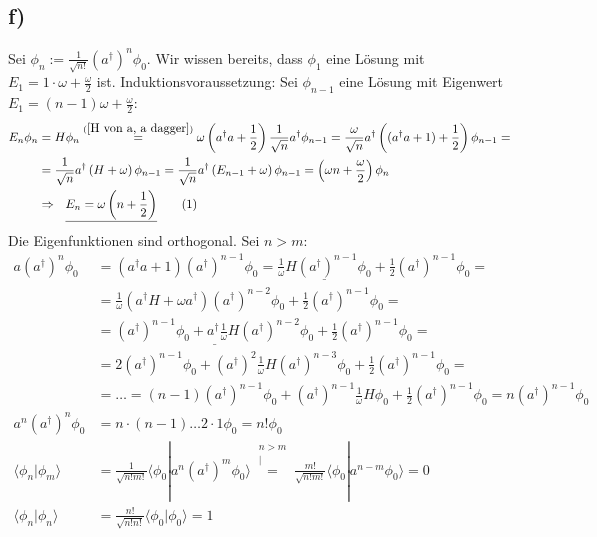 \documentclass[a4paper,12pt]{article}
\newcommand\numberthis{\addtocounter{equation}{1}\tag{\theequation}}
\newcommand{\kom}{}
\newcommand{\brak}{}
\newcommand{\kla}{}
\begin{document}
\subsection*{f)}
Sei $\phi_n:=\frac{1}{\sqrt{n!}}(a^\dagger)^n\phi_0$. Wir wissen bereits, dass $\phi_1$ eine Lösung mit $E_1=1\cdot\omega +\frac{\omega}{2}$ ist. Induktionsvoraussetzung: Sei $\phi_{n-1}$ eine Lösung mit Eigenwert $E_1=(n-1)\omega +\frac{\omega}{2}$:
\begin{align*}
E_n\phi_n&=H\phi_n\overset{(\ref{H von a, a dagger})}{=}\omega\kla\left( {a^\dagger a+\frac{1}{2}} \right)\frac{1}{\sqrt{n}}a^\dagger\phi_{n-1}=\frac{\omega}{\sqrt{n}}a^\dagger \kla\left( {(a^\dagger a+1)+\frac{1}{2}} \right)\phi_{n-1}= \\
&=\frac{1}{\sqrt{n}}a^\dagger \kla\left( {H+\omega} \right)\phi_{n-1}=\frac{1}{\sqrt{n}}a^\dagger \kla\left( {E_{n-1}+\omega} \right)\phi_{n-1}=\kla\left( {\omega n+\frac{\omega}{2}} \right)\phi_n\\
&\Rightarrow\ \ \underline{E_n=\omega\kla\left( {n+\frac{1}{2}} \right)}\numberthis\label{E_n}
\end{align*}
Die Eigenfunktionen sind orthogonal. Sei $n>m$:
\begin{align*}
a(a^\dagger)^n\phi_0&=(a^\dagger a+1)(a^\dagger)^{n-1}\phi_0=\underline{\frac{1}{\omega}H(a^\dagger)^{n-1}\phi_0}+\frac{1}{2}(a^\dagger)^{n-1}\phi_0= \\
&=\frac{1}{\omega}(a^\dagger H+\omega a^\dagger)(a^\dagger)^{n-2}\phi_0+\frac{1}{2}(a^\dagger)^{n-1}\phi_0= \\
&=\underline{(a^\dagger)^{n-1}\phi_0+a^\dagger\frac{1}{\omega}H(a^\dagger)^{n-2}\phi_0}+\frac{1}{2}(a^\dagger)^{n-1}\phi_0= \\
&=2(a^\dagger)^{n-1}\phi_0+(a^\dagger)^2\frac{1}{\omega}H(a^\dagger)^{n-3}\phi_0+\frac{1}{2}(a^\dagger)^{n-1}\phi_0= \\ 
&=\dots =(n-1)(a^\dagger)^{n-1}\phi_0+(a^\dagger)^{n-1}\frac{1}{\omega}H\phi_0+\frac{1}{2}(a^\dagger)^{n-1}\phi_0=n(a^\dagger)^{n-1}\phi_0 \\
a^{n}(a^\dagger)^n\phi_0&=n\cdot (n-1)\dots 2\cdot 1 \phi_0=n!\phi_0 \\
\brak\langle {\phi_n}| {\phi_m}\rangle&=\frac{1}{\sqrt{n!m!}}\brak\langle {\phi_0}| {a^n(a^\dagger)^m\phi_0}\rangle\kom\overset{\substack{{n >m} \\ |}}{=}\frac{m!}{\sqrt{n!m!}}\brak\langle {\phi_0}| {a^{n-m}\phi_0}\rangle=0 \\
\brak\langle {\phi_n}| {\phi_n}\rangle&=\frac{n!}{\sqrt{n!n!}}\brak\langle {\phi_0}| {\phi_0}\rangle=1
\end{align*}
\end{document}
